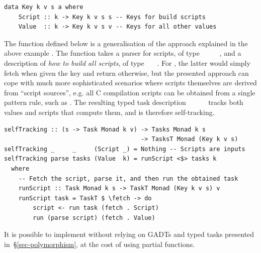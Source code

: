 \vspace{1mm}
\begin{verbatim}
data Key k v s a where
    Script :: k -> Key k v s s -- Keys for build scripts
    Value  :: k -> Key k v s v -- Keys for all other values
\end{verbatim}
\vspace{1mm}

\noindent
The function  defined below is a generalisation of the approach
explained in the above \Excel example . The function takes a parser
for scripts, of type ~\hs{->}~~~~, and a
description of \emph{how to build all scripts}, of type
~~~. For , the latter would simply
fetch  when given the key  and return 
otherwise, but the presented approach can cope with much more sophisticated
scenarios where scripts themselves are derived from ``script sources'', e.g. all
C compilation scripts can be obtained from a single pattern rule, such as
. The resulting typed task description
~~~~~ tracks both values and
scripts that compute them, and is therefore self-tracking.

\vspace{1mm}
\begin{verbatim}
selfTracking :: (s -> Task Monad k v) -> Tasks Monad k s
                                      -> TasksT Monad (Key k v s)
selfTracking _     _     (Script _) = Nothing -- Scripts are inputs
selfTracking parse tasks (Value  k) = runScript <$> tasks k
  where
    -- Fetch the script, parse it, and then run the obtained task
    runScript :: Task Monad k s -> TaskT Monad (Key k v s) v
    runScript task = TaskT $ \fetch -> do
        script <- run task (fetch . Script)
        run (parse script) (fetch . Value)
\end{verbatim}
\vspace{1mm}

\noindent
It is possible to implement  without relying on GADTs and typed
tasks presented in~\S\ref{sec-polymorphism}, at the cost of using partial
functions.
